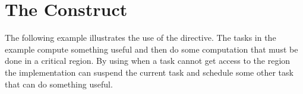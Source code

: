\pagebreak
\section{The  Construct}
\label{sec:taskyield}

The following example illustrates the use of the   directive. 
The tasks in the example compute something useful and then do some computation 
that must be done in a critical region. By using  when a task 
cannot get access to the  region the implementation can suspend 
the current task and schedule some other task that can do something useful. 



